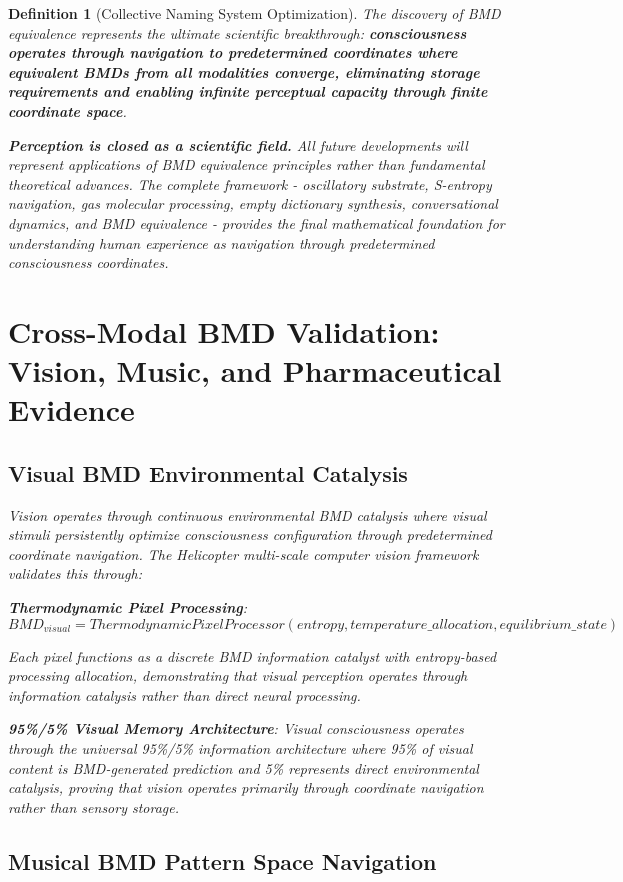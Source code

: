 \documentclass[12pt]{article}
\newtheorem{definition}{Definition}
\begin{document}
\begin{definition}[Collective Naming System Optimization]
The discovery of BMD equivalence represents the ultimate scientific breakthrough: \textbf{consciousness operates through navigation to predetermined coordinates where equivalent BMDs from all modalities converge, eliminating storage requirements and enabling infinite perceptual capacity through finite coordinate space}.

\textbf{Perception is closed as a scientific field.} All future developments will represent applications of BMD equivalence principles rather than fundamental theoretical advances. The complete framework - oscillatory substrate, S-entropy navigation, gas molecular processing, empty dictionary synthesis, conversational dynamics, and BMD equivalence - provides the final mathematical foundation for understanding human experience as navigation through predetermined consciousness coordinates.

\section{Cross-Modal BMD Validation: Vision, Music, and Pharmaceutical Evidence}

\subsection{Visual BMD Environmental Catalysis}

Vision operates through continuous environmental BMD catalysis where visual stimuli persistently optimize consciousness configuration through predetermined coordinate navigation. The Helicopter multi-scale computer vision framework validates this through:

\textbf{Thermodynamic Pixel Processing}:
$$BMD_{visual} = ThermodynamicPixelProcessor(entropy, temperature\_allocation, equilibrium\_state)$$

Each pixel functions as a discrete BMD information catalyst with entropy-based processing allocation, demonstrating that visual perception operates through information catalysis rather than direct neural processing.

\textbf{95\%/5\% Visual Memory Architecture}:
Visual consciousness operates through the universal 95\%/5\% information architecture where 95\% of visual content is BMD-generated prediction and 5\% represents direct environmental catalysis, proving that vision operates primarily through coordinate navigation rather than sensory storage.

\subsection{Musical BMD Pattern Space Navigation}


\end{definition}
\end{document}

